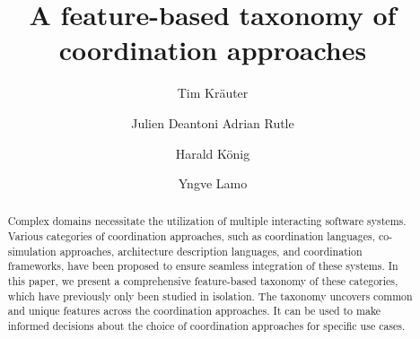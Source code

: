 \documentclass[runningheads]{llncs}
\begin{document}
\title{A feature-based taxonomy of coordination approaches}

\author{Tim Kr\"{a}uter \and
Julien Deantoni
Adrian Rutle \and
Harald K\"{o}nig \and
Yngve Lamo}
%
%
\maketitle

\begin{abstract}

Complex domains necessitate the utilization of multiple interacting software systems.
Various categories of coordination approaches, such as coordination languages, co-simulation approaches, architecture description languages, and coordination frameworks, have been proposed to ensure seamless integration of these systems.
In this paper, we present a comprehensive feature-based taxonomy of these categories, which have previously only been studied in isolation.
The taxonomy uncovers common and unique features across the coordination approaches.
It can be used to make informed decisions about the choice of coordination approaches for specific use cases.

\end{abstract}


\end{document}
